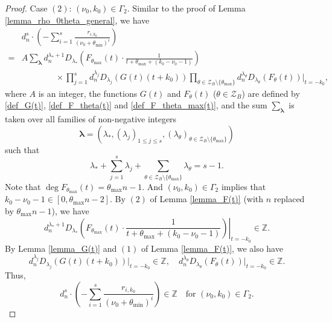 \documentclass[12pt]{article}
\numberwithin{equation}{section}
\begin{document}
\begin{proof}
Case $(2)$: $(\nu_0,k_0) \in \Gamma_2$. Similar to the proof of Lemma \ref{lemma_rho_0theta_general}, we have 
\begin{align*}
	&d_n^{s} \cdot \left(-\sum_{i=1}^{s}\frac{r_{i,k_0}}{(\nu_0+\theta_{\min})^{i}} \right) \\
	=& A \sum_{\boldsymbol{\lambda}} d_n^{\lambda_{*}+1}D_{\lambda_{*}}\left( F_{\theta_{\max}}(t)\cdot\frac{1}{t+\theta_{\max}+(k_0-\nu_0-1)} \right) \\ &\qquad\qquad\times\prod_{j=1}^{s}d_n^{\lambda_j}D_{\lambda_j}(G(t)(t+k_0))\prod_{\theta \in \mathcal{Z}_B\setminus\{\theta_{\max}\}}d_n^{\lambda_\theta}D_{\lambda_\theta}(F_{\theta}(t))\big|_{t=-k_0},
\end{align*}
where $A$ is an integer, the functions $G(t)$ and $F_{\theta}(t)$ ($\theta \in \mathcal{Z}_B$) are defined by \eqref{def_G(t)}, \eqref{def_F_theta(t)} and \eqref{def_F_theta_max(t)}, and the sum $\sum_{\boldsymbol{\lambda}}$ is taken over all families of non-negative integers 
\[\boldsymbol{\lambda} = (\lambda_*, (\lambda_{j})_{1 \leqslant j \leqslant s},(\lambda_{\theta})_{\theta \in \mathcal{Z}_B\setminus\{\theta_{\max}\}})\]
such that
\[ \lambda_* + \sum_{j=1}^{s} \lambda_j + \sum_{\theta \in \mathcal{Z}_B\setminus\{\theta_{\max}\}} \lambda_{\theta} = s-1. \]
Note that $\deg F_{\theta_{\max}}(t) = \theta_{\max}n-1$. And $(\nu_0,k_0) \in \Gamma_2$ implies that $k_0-\nu_0-1 \in [0,\theta_{\max}n-2]$. By $(2)$ of Lemma \ref{lemma_F(t)} (with $n$ replaced by $\theta_{\max}n-1$), we have
\[ \left. d_n^{\lambda_{*}+1}D_{\lambda_{*}}\left( F_{\theta_{\max}}(t)\cdot\frac{1}{t+\theta_{\max}+(k_0-\nu_0-1)} \right)\right|_{t=-k_0} \in \mathbb{Z}. \]
By Lemma \ref{lemma_G(t)} and $(1)$ of Lemma \ref{lemma_F(t)}, we also have
\[ d_n^{\lambda_j}D_{\lambda_j}(G(t)(t+k_0))\big|_{t=-k_0} \in \mathbb{Z}, \quad d_n^{\lambda_\theta}D_{\lambda_\theta}(F_{\theta}(t))\big|_{t=-k_0} \in \mathbb{Z}. \]
Thus, 
\begin{equation}\label{case_2}
d_n^s \cdot\left(-\sum_{i=1}^{s}\frac{r_{i,k_0}}{(\nu_0+\theta_{\min})^{i}}\right) \in \mathbb{Z} \quad\text{for~} (\nu_0,k_0) \in \Gamma_2.
\end{equation}


\end{proof}
\end{document}
